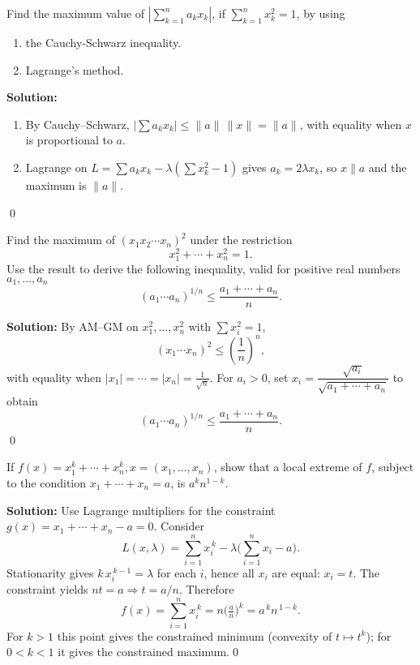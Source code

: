 \begin{problembox}
Find the maximum value of \(| \sum_{k=1}^n a_k x_k |\), if \(\sum_{k=1}^n x_k^2 = 1\), by using 
\begin{enumerate}[label=(\alph*)]
    \item the Cauchy-Schwarz inequality.
    \item Lagrange's method.
\end{enumerate}
\end{problembox}

\noindent\textbf{Solution:}
\begin{enumerate}[label=(\alph*)]
    \item By Cauchy--Schwarz, $\big|\sum a_k x_k\big|\le \|a\|\,\|x\|=\|a\|$, with equality when $x$ is proportional to $a$.
    \item Lagrange on $L=\sum a_k x_k-\lambda(\sum x_k^2-1)$ gives $a_k=2\lambda x_k$, so $x\parallel a$ and the maximum is $\|a\|$.
\end{enumerate}\qed


\begin{problembox}
Find the maximum of \((x_1 x_2 \cdots x_n)^2\) under the restriction
\[ x_1^2 + \cdots + x_n^2 = 1. \]
Use the result to derive the following inequality, valid for positive real numbers \(a_1, \ldots, a_n\)
\[ (a_1 \cdots a_n)^{1/n} \leq \frac{a_1 + \cdots + a_n}{n}. \]
\end{problembox}

\noindent\textbf{Solution:}
By AM--GM on $x_1^2,\dots,x_n^2$ with $\sum x_i^2=1$,
\[(x_1\cdots x_n)^2\le \left(\frac{1}{n}\right)^n,\]
with equality when $|x_1|=\cdots=|x_n|=\tfrac{1}{\sqrt n}$. For $a_i>0$, set $x_i=\dfrac{\sqrt{a_i}}{\sqrt{a_1+\cdots+a_n}}$ to obtain
\[(a_1\cdots a_n)^{1/n}\le \frac{a_1+\cdots+a_n}{n}.
\]\qed


\begin{problembox}
If \(f(x) = x_1^k + \cdots + x_n^k, x = (x_1, \ldots, x_n)\), show that a local extreme of \(f\), subject to the condition \(x_1 + \cdots + x_n = a\), is \(a^k n^{1-k}\).
\end{problembox}

\noindent\textbf{Solution:}
Use Lagrange multipliers for the constraint \(g(x)=x_1+\cdots+x_n-a=0\). Consider
\[L(x,\lambda)=\sum_{i=1}^n x_i^{\,k}-\lambda\Big(\sum_{i=1}^n x_i-a\Big).\]
Stationarity gives \(k\,x_i^{\,k-1}=\lambda\) for each \(i\), hence all \(x_i\) are equal: \(x_i=t\). The constraint yields \(nt=a\Rightarrow t=a/n\). Therefore
\[f(x)=\sum_{i=1}^n x_i^{\,k}=n\Big(\tfrac{a}{n}\Big)^{\!k}=a^{\,k}n^{\,1-k}.
\]
For \(k>1\) this point gives the constrained minimum (convexity of \(t\mapsto t^{k}\)); for \(0<k<1\) it gives the constrained maximum.\qed


